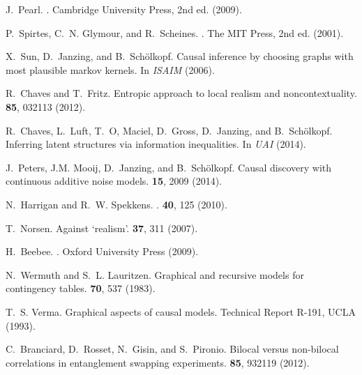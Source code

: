 \documentclass[letterpaper,onecolumn,nofootinbib]{revtex4}
\begin{document}
%
%

\begin{thebibliography}{10}

J.~Pearl.
.
\newblock Cambridge University Press, 2nd ed. (2009).

P.~Spirtes, C.~N. Glymour, and R.~Scheines.
.
\newblock The MIT Press, 2nd ed. (2001).

X.~Sun, D.~Janzing, and B.~Sch{\"o}lkopf.
\newblock Causal inference by choosing graphs with most plausible markov
  kernels.
\newblock In {\em ISAIM} (2006).

R.~Chaves and T.~Fritz.
\newblock Entropic approach to local realism and noncontextuality.
 \textbf{85}, 032113 (2012).

R.~Chaves, L.~Luft, T.~O, Maciel, D.~Gross, D.~Janzing, and B.~Sch{\"o}lkopf.
\newblock Inferring latent structures via information inequalities.
\newblock In {\em UAI} (2014).

J.~Peters, J.M. Mooij, D.~Janzing, and B.~Sch\"{o}lkopf.
\newblock Causal discovery with continuous additive noise models.
 \textbf{15}, 2009 (2014).

N.~Harrigan and R.~W. Spekkens.
.
 \textbf{40}, 125 (2010).

T.~Norsen.
\newblock Against `realism'.
 \textbf{37}, 311 (2007).

H.~Beebee.
.
\newblock Oxford University Press (2009).

N.~Wermuth and S.~L. Lauritzen.
\newblock Graphical and recursive models for contingency tables.
 \textbf{70}, 537 (1983).

T.~S. Verma.
\newblock Graphical aspects of causal models.
\newblock Technical Report R-191, UCLA (1993).

C.~Branciard, D.~Rosset, N.~Gisin, and S.~Pironio.
\newblock Bilocal versus non-bilocal correlations in entanglement swapping
  experiments.
 \textbf{85}, 932119 (2012).


\end{thebibliography}
\end{document}
